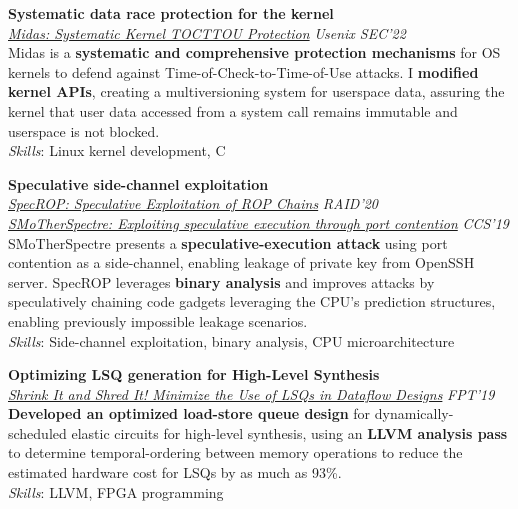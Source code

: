 \documentclass[margin, 10pt]{res} %
\begin{document}
\begin{resume}
\newpage
{\bf Systematic data race protection for the kernel} \\
{\sl \href{http://nebelwelt.net/files/22SEC.pdf}{Midas: Systematic Kernel TOCTTOU Protection}} \hfill \emph{Usenix SEC'22} \\
Midas is a {\bf systematic and comprehensive protection mechanisms} for OS kernels to defend against Time-of-Check-to-Time-of-Use attacks. I {\bf modified kernel APIs}, creating a multiversioning system for userspace data, assuring the kernel that user data accessed from a system call remains immutable and userspace is not blocked.\\
{\sl Skills}: Linux kernel development, C

{\bf Speculative side-channel exploitation} \\
{\sl \href{https://infoscience.epfl.ch/record/278929}{SpecROP: Speculative Exploitation of ROP Chains}} \hfill \emph{RAID'20} \\
{\sl \href{https://dl.acm.org/doi/abs/10.1145/3319535.3363194}{SMoTherSpectre: Exploiting speculative execution through port contention}} \hfill \emph{CCS'19} \\
SMoTherSpectre presents a {\bf speculative-execution attack} using port contention as a side-channel, enabling leakage of private key from OpenSSH server. %
SpecROP leverages {\bf binary analysis} and improves attacks by speculatively chaining code gadgets leveraging the CPU's prediction structures, enabling previously impossible leakage scenarios. \\
{\sl Skills}: Side-channel exploitation, binary analysis, CPU microarchitecture


{\bf Optimizing LSQ generation for High-Level Synthesis } \\
{\sl \href{https://ieeexplore.ieee.org/document/8977873}{Shrink It and Shred It! Minimize the Use of LSQs in Dataflow Designs}} \hfill \emph{FPT'19} \\
{\bf Developed an optimized load-store queue design} for dynamically-scheduled elastic circuits for high-level synthesis, using an {\bf LLVM analysis pass} to determine temporal-ordering between memory operations to reduce the estimated hardware cost for LSQs by as much as 93\%. \\
{\sl Skills}: LLVM, FPGA programming


\end{resume}
\end{document}
